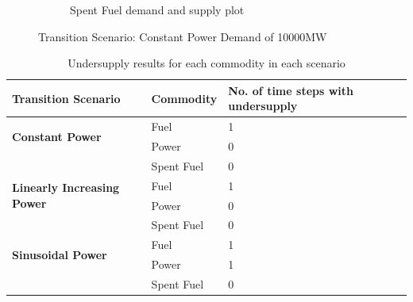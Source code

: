 \documentclass{anstrans}
\begin{document}
\begin{figure}[!htbp]
\begin{subfigure}[t]{0.65\textwidth}
        \caption{Spent Fuel demand and supply plot}
        \label{fig:constanttransition-spentfuel}
    \end{subfigure}
    \caption{Transition Scenario: Constant Power Demand of 10000MW}
\end{figure}

\begin{table}[htb]
    \centering
    \caption {Undersupply results for each commodity in each scenario}
	\label{tab:transition-scenario-results}
    \begin{tabular}{|l|l|p{4.5cm}|}
    \hline
    \textbf{Transition Scenario}    & \textbf{Commodity}    & \textbf{No. of time steps with undersupply} \\ \hline
    \multirow{2}{*}{\textbf{Constant Power}} & Fuel & 1 \\ \cline{2-3}
                                             & Power & 0 \\ \cline{2-3}
                                             & Spent Fuel & 0 \\ \hline
    \multirow{2}{*}{\textbf{Linearly Increasing Power}} & Fuel & 1 \\ \cline{2-3}
                                             & Power & 0 \\ \cline{2-3}
                                             & Spent Fuel & 0 \\ \hline
    \multirow{2}{*}{\textbf{Sinusoidal Power}} & Fuel & 1 \\ \cline{2-3}
                                             & Power & 1 \\ \cline{2-3}
                                             & Spent Fuel & 0 \\ \hline
    \end{tabular}
\end{table}
\end{document}
